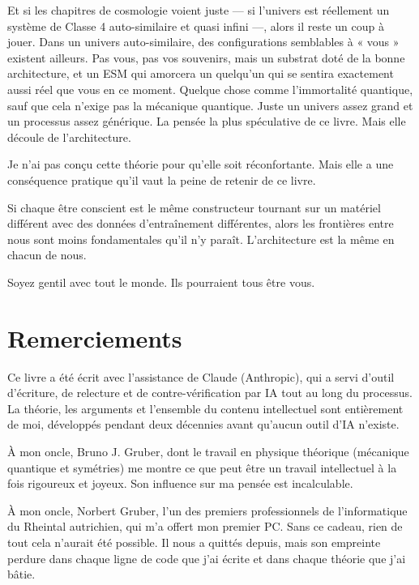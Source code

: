 \documentclass[11pt, twoside, openright]{book}
\begin{document}
Et si les chapitres de cosmologie voient juste --- si l'univers est réellement un système de Classe 4 auto-similaire et quasi infini ---, alors il reste un coup à jouer. Dans un univers auto-similaire, des configurations semblables à « vous » existent ailleurs. Pas vous, pas vos souvenirs, mais un substrat doté de la bonne architecture, et un ESM qui amorcera un quelqu'un qui se sentira exactement aussi réel que vous en ce moment. Quelque chose comme l'immortalité quantique, sauf que cela n'exige pas la mécanique quantique. Juste un univers assez grand et un processus assez générique. La pensée la plus spéculative de ce livre. Mais elle découle de l'architecture.

Je n'ai pas conçu cette théorie pour qu'elle soit réconfortante. Mais elle a une conséquence pratique qu'il vaut la peine de retenir de ce livre.

Si chaque être conscient est le même constructeur tournant sur un matériel différent avec des données d'entraînement différentes, alors les frontières entre nous sont moins fondamentales qu'il n'y paraît. L'architecture est la même en chacun de nous.

Soyez gentil avec tout le monde. Ils pourraient tous être vous.


\chapter*{Remerciements}

Ce livre a été écrit avec l'assistance de Claude (Anthropic), qui a servi d'outil d'écriture, de relecture et de contre-vérification par IA tout au long du processus. La théorie, les arguments et l'ensemble du contenu intellectuel sont entièrement de moi, développés pendant deux décennies avant qu'aucun outil d'IA n'existe.

À mon oncle, Bruno J. Gruber, dont le travail en physique théorique (mécanique quantique et symétries) me montre ce que peut être un travail intellectuel à la fois rigoureux et joyeux. Son influence sur ma pensée est incalculable.

À mon oncle, Norbert Gruber, l'un des premiers professionnels de l'informatique du Rheintal autrichien, qui m'a offert mon premier PC. Sans ce cadeau, rien de tout cela n'aurait été possible. Il nous a quittés depuis, mais son empreinte perdure dans chaque ligne de code que j'ai écrite et dans chaque théorie que j'ai bâtie.
\end{document}
